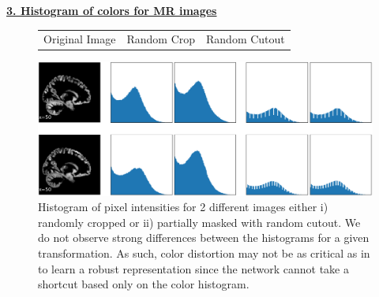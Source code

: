 \documentclass[runningheads]{llncs}
\begin{document}
\justify
\underline{\textbf{3. Histogram of colors for MR images}}
\label{supp_color_histo}

\begin{figure}[H]
\setlength{\tabcolsep}{.2pt}
\begin{tabular}{m{.2\linewidth} >{\centering\arraybackslash}m{.4\linewidth} >{\centering\arraybackslash}m{.4\linewidth}}
    Original Image & Random Crop & Random Cutout \\
\end{tabular}
\includegraphics[width=\linewidth]{color_histogram_crop_cutout.png}
\caption{Histogram of pixel intensities for 2 different images either i) randomly cropped or ii) partially masked with random cutout. We do not observe strong differences between the histograms for a given transformation. As such, color distortion may not be as critical as in \cite{chen2020simCLR}  to learn a robust representation since the network cannot take a shortcut based only on the color histogram.}%
\label{color_histogram_crop_cutout}
\end{figure}
\end{document}
